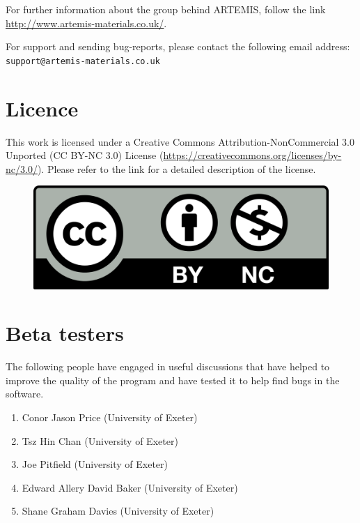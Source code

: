 \documentclass[12pt,a4paper,onecolumn,titlepage]{report}
\newcommand{\codeinline}[2][]{{\tt#2}}
\newcommand{\artemis}{{ARTEMIS}}
\begin{document}
For further information about the group behind \artemis{}, follow the link \url{http://www.artemis-materials.co.uk/}.

For support and sending bug-reports, please contact the following email address:
\noindent
\codeinline{support@artemis-materials.co.uk}




\section{Licence}
\label{sec:licence}

This work is licensed under a Creative Commons Attribution-NonCommercial 3.0 Unported (CC BY-NC 3.0) License (\url{https://creativecommons.org/licenses/by-nc/3.0/}). Please refer to the link for a detailed description of the license.

\begin{figure}[h]{}
\includegraphics[scale=0.1]{Cc-by-nc_icon.png}\label{fig:cc}
\end{figure}

\section{Beta testers}
\label{sec:testers}

The following people have engaged in useful discussions that have helped to improve the quality of the program and have tested it to help find bugs in the software.

\begin{enumerate}
\item Conor Jason Price (University of Exeter)
\item Tsz Hin Chan (University of Exeter)
\item Joe Pitfield (University of Exeter)
\item Edward Allery David Baker (University of Exeter)
\item Shane Graham Davies (University of Exeter)
\end{enumerate}
\end{document}
